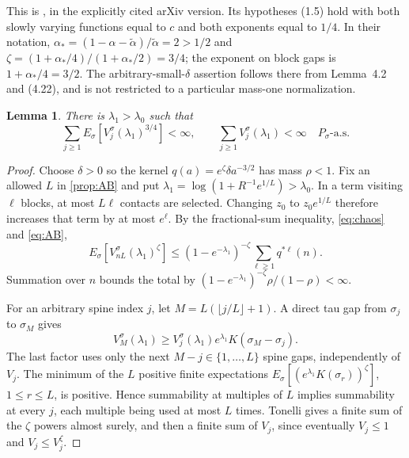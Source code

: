 \documentclass[11pt]{article}
\newtheorem{lemma}[lemma]{Lemma}
\theoremstyle{remark}
\numberwithin{equation}{section}
\begin{document}
This is \cite[(4.12)]{AB}, in the explicitly cited arXiv version.
Its hypotheses (1.5) hold with both slowly varying functions equal to $c$
and both exponents equal to $1/4$. In their notation,
$\alpha_*=(1-\alpha-\widetilde\alpha)/\widetilde\alpha=2>1/2$ and
$\zeta=(1+\alpha_*/4)/(1+\alpha_*/2)=3/4$; the exponent on block gaps
is $1+\alpha_*/4=3/2$. The arbitrary-small-$\delta$ assertion follows
there from Lemma~4.2 and (4.22), and is not restricted to a particular
mass-one normalization.

\begin{lemma}\label{lem:spine-sum}
There is $\lambda_1>\lambda_0$ such that
\begin{equation}\label{eq:spine-sum}
 \sum_{j\ge1}E_\sigma[V_j^\sigma(\lambda_1)^{3/4}]<\infty,
 \qquad \sum_{j\ge1}V_j^\sigma(\lambda_1)<\infty
 \quad P_\sigma\text{-a.s.}
\end{equation}
\end{lemma}
\begin{proof}
Choose $\delta>0$ so the kernel
$q(a)=e^\zeta\delta a^{-3/2}$ has mass $\rho<1$.
Fix an allowed $L$ in \cref{prop:AB} and put
$\lambda_1=\log(1+R^{-1}e^{1/L})>\lambda_0$.
In a term visiting $\ell$ blocks, at most $L\ell$ contacts are selected.
Changing $z_0$ to $z_0e^{1/L}$ therefore increases that term by at most
$e^\ell$. By the fractional-sum inequality, \eqref{eq:chaos} and
\eqref{eq:AB},
\[
 E_\sigma[V_{nL}^\sigma(\lambda_1)^\zeta]
 \le(1-e^{-\lambda_1})^{-\zeta}
            \sum_{\ell\ge1}q^{*\ell}(n).
\]
Summation over $n$ bounds the total by
$(1-e^{-\lambda_1})^{-\zeta}\rho/(1-\rho)<\infty$.

For an arbitrary spine index $j$, let $M=L(\lfloor j/L\rfloor+1)$.
A direct tau gap from $\sigma_j$ to $\sigma_M$ gives
\[
 V_M^\sigma(\lambda_1)\ge V_j^\sigma(\lambda_1)
                    e^{\lambda_1}K(\sigma_M-\sigma_j).
\]
The last factor uses only the next $M-j\in\{1,\ldots,L\}$ spine gaps,
independently of $V_j$. The minimum of the $L$ positive finite expectations
$E_\sigma[(e^{\lambda_1}K(\sigma_r))^\zeta]$, $1\le r\le L$, is positive.
Hence summability at multiples of $L$ implies summability at every $j$,
each multiple being used at most $L$ times. Tonelli gives a finite sum of
the $\zeta$ powers almost surely, and then a finite sum of $V_j$, since
eventually $V_j\le1$ and $V_j\le V_j^\zeta$.
\end{proof}
\end{document}
